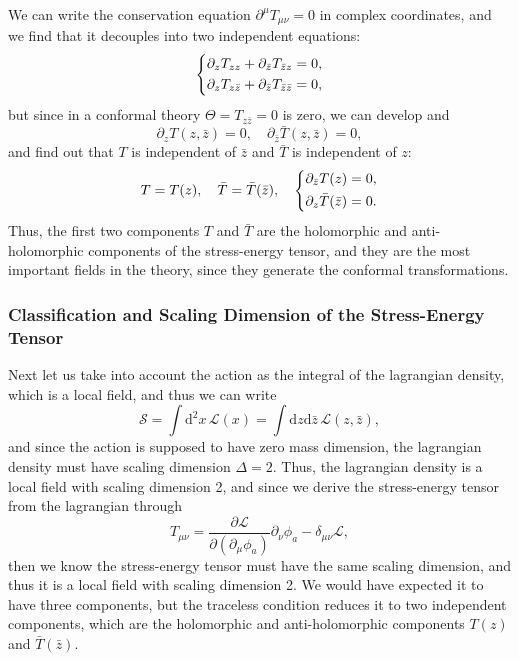 We can write the conservation equation \(\partial^\mu T_{\mu\nu} = 0\) in complex coordinates, and we find that it decouples into two independent equations:
\[
    \begin{dcases}
        \partial_{z} T_{z z} + \partial_{\bar{z}} T_{\bar{z}z} = 0, \\
        \partial_{z}  T_{z\bar{z}} + \partial_{\bar{z}} T_{\bar{z}\bar{z}} = 0,
    \end{dcases}
\]
but since in a conformal theory \(\Theta = T_{z \bar{z}} = 0\) is zero, we can develop and
\[
    \partial_{z} T(z,\bar{z}) = 0, \quad \partial_{\bar{z}} \bar{T}(z,\bar{z}) = 0,
\]
and find out that \(T\) is independent of \(\bar{z}\) and \(\bar{T}\) is independent of \(z\):
\[
    T=T(z), \quad \bar{T} = \bar{T}(\bar{z}), \quad \begin{dcases}
        \partial_{\bar{z}} T(z) = 0, \\
        \partial_z \bar{T}(\bar{z}) = 0.
    \end{dcases}
\]
Thus, the first two components \(T\) and \(\bar{T}\) are the holomorphic and anti-holomorphic components of the stress-energy tensor, and they are the most important fields in the theory, since they generate the conformal transformations.

\subsubsection{Classification and Scaling Dimension of the Stress-Energy Tensor}

Next let us take into account the action  as the integral of the lagrangian density, which is a local field, and thus we can write
\[
    \mathcal{S} = \int \mathrm{d}^2 x \, \mathcal{L}(x) = \int \mathrm{d} z \mathrm{d} \bar{z} \, \mathcal{L}(z, \bar{z}),
\]
and since the action is supposed to have zero mass dimension, the lagrangian density must have scaling dimension \(\Delta = 2\). Thus, the lagrangian density is a local field with scaling dimension 2, and since we derive the stress-energy tensor from the lagrangian through
\[
    T_{\mu\nu}=\frac{\partial\mathcal{L}}{\partial(\partial_{\mu}\phi_{a})}\partial_{\nu}\phi_{a}-\delta_{\mu\nu}\mathcal{L},
\]
then we know the stress-energy tensor must have the same scaling dimension, and thus it is a local field with scaling dimension 2. We would have expected it to have three components, but the traceless condition reduces it to two independent components, which are the holomorphic and anti-holomorphic components \(T(z)\) and \(\bar{T}(\bar{z})\).

